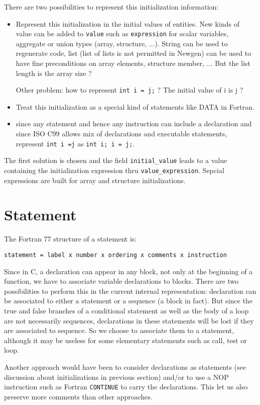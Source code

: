 \documentclass[a4paper]{report}
\begin{document}
There are two possibilities to represent this initialization information:
\begin{itemize}
\item Represent this initialization in the initial values of
entities. New kinds of value can be added to \verb/value/ such as
\verb/expression/ for scalar variables, 
aggregate or union types (array, structure, ...). String can be used to
  regenerate code, list (list of lists is not permitted in Newgen) can be used  to
  have fine preconditions on array elements, structure member, ... But the
  list length is the array size ?

Other problem: how to represent \verb/int i = j;/ ? The initial value of i
is j ?
\item Treat this initialization as a special kind of statements like DATA
  in Fortran.
\item since any statement and hence any instruction can include a
  declaration and since ISO C99 allows mix of declarations and
  executable statements, represent \lstinline/int i =j/ as
  \lstinline/int i; i = j;/.
\end{itemize}
The first solution is chosen and the field \verb/initial_value/ leads
to a value containing the initialization expression thru
\verb/value_expression/. Sepcial expressions are built for array and
structure initializations.

\section{Statement}
\label{statement}
 
The Fortran 77 structure of a statement is:
 
\verb/statement = label x number x ordering x comments x instruction/

Since in C, a declaration can appear in any block, not only at the
beginning of a function, we have to associate variable declarations to
blocks. There are two possibilities to perform this in the current
internal representation: declaration can be associated to either a
statement or a sequence (a block in fact). But since the true and
false branches of a conditional statement as well as the body of a
loop are not necessarily sequences, declarations in these statements
will be lost if they are associated to sequence. So we choose to
associate them to a statement, although it may be useless for some
elementary statements such as call, test or loop.

Another approach would have been to consider declarations as
statements (see discussion about initializations in previous section)
and/or to use a NOP instruction such as Fortran \verb/CONTINUE/ to
carry the declarations. This let us also preserve more comments than
other approaches.
\end{document}
